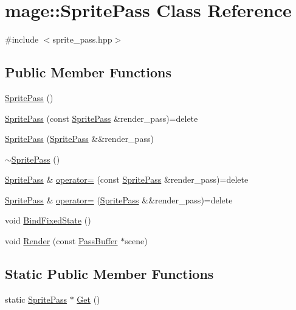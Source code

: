 \hypertarget{classmage_1_1_sprite_pass}{}\section{mage\+:\+:Sprite\+Pass Class Reference}
\label{classmage_1_1_sprite_pass}


{\ttfamily \#include $<$sprite\+\_\+pass.\+hpp$>$}

\subsection*{Public Member Functions}
\begin{DoxyCompactItemize}
\item 
\hyperlink{classmage_1_1_sprite_pass_abe484eb7c99dabc585d874029c85013f}{Sprite\+Pass} ()
\item 
\hyperlink{classmage_1_1_sprite_pass_ac24c782ce252cbbe179aab2277507a87}{Sprite\+Pass} (const \hyperlink{classmage_1_1_sprite_pass}{Sprite\+Pass} \&render\+\_\+pass)=delete
\item 
\hyperlink{classmage_1_1_sprite_pass_a2af9ccc7970eeff94293638d0cd26d16}{Sprite\+Pass} (\hyperlink{classmage_1_1_sprite_pass}{Sprite\+Pass} \&\&render\+\_\+pass)
\item 
\hyperlink{classmage_1_1_sprite_pass_a70a866324750c21196d80364e9a0e309}{$\sim$\+Sprite\+Pass} ()
\item 
\hyperlink{classmage_1_1_sprite_pass}{Sprite\+Pass} \& \hyperlink{classmage_1_1_sprite_pass_afa43bb0a8588e9196180aa686d81cacc}{operator=} (const \hyperlink{classmage_1_1_sprite_pass}{Sprite\+Pass} \&render\+\_\+pass)=delete
\item 
\hyperlink{classmage_1_1_sprite_pass}{Sprite\+Pass} \& \hyperlink{classmage_1_1_sprite_pass_aed8cc2bcb9ded1cb96c9d65bb7034c0a}{operator=} (\hyperlink{classmage_1_1_sprite_pass}{Sprite\+Pass} \&\&render\+\_\+pass)=delete
\item 
void \hyperlink{classmage_1_1_sprite_pass_a796f9aad70558e3ae0b792b9c674208d}{Bind\+Fixed\+State} ()
\item 
void \hyperlink{classmage_1_1_sprite_pass_ad617d46a3edbf5ee533f4d20e3d69ae2}{Render} (const \hyperlink{structmage_1_1_pass_buffer}{Pass\+Buffer} $\ast$scene)
\end{DoxyCompactItemize}
\subsection*{Static Public Member Functions}
\begin{DoxyCompactItemize}
\item 
static \hyperlink{classmage_1_1_sprite_pass}{Sprite\+Pass} $\ast$ \hyperlink{classmage_1_1_sprite_pass_a0044e0756f5f96f24c188424f9769a02}{Get} ()
\end{DoxyCompactItemize}
